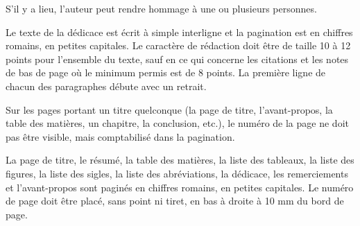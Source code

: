 \begin{dedic}

S’il y a lieu, l’auteur peut rendre hommage à une ou plusieurs personnes.

Le texte de la dédicace est écrit à simple interligne et la pagination est en chiffres romains, en petites capitales. Le caractère de rédaction doit être de taille 10 à 12 points pour l’ensemble du texte, sauf en ce qui concerne les citations et les notes de bas de page où le minimum permis est de 8 points. La première ligne de chacun des paragraphes débute avec un retrait.

Sur les pages portant un titre quelconque (la page de titre, l’avant-propos, la table des matières, un chapitre, la conclusion, etc.), le numéro de la page ne doit pas être visible, mais comptabilisé dans la pagination. 

La page de titre, le résumé, la table des matières, la liste des tableaux, la liste des figures, la liste des sigles, la liste des abréviations, la dédicace, les remerciements et l’avant-propos sont paginés en chiffres romains, en petites capitales. Le numéro de page doit être placé, sans point ni tiret, en bas à droite à 10 mm du bord de page.

\end{dedic}
